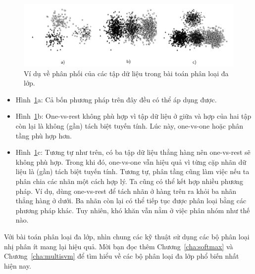 \begin{figure}[t]
\centering
    \includegraphics[width = \textwidth]{Chapters/05_NeuralNetworks/12_binaryclassifiers/latex/dist.pdf}
    \caption[]{Ví dụ về phân phối của các tập dữ liệu trong bài toán
    phân loại đa lớp.}
    \label{fig:10_4}
\end{figure}
\begin{itemize}
\item Hình~\ref{fig:10_4}a: Cả bốn phương pháp trên đây đều có thể áp dụng được. 
 
\item Hình~\ref{fig:10_4}b: One-vs-rest không phù hợp vì tập dữ liệu ở giữa và
hợp của hai tập còn lại là không (gần) {tách biệt tuyến tính}. Lúc này,
one-vs-one hoặc phân tầng phù hợp hơn.
 
\item Hình~\ref{fig:10_4}c: Tương tự như trên, có ba tập dữ liệu thẳng hàng
nên one-vs-rest sẽ không phù hợp. Trong khi đó, one-vs-one vẫn hiệu quả vì
từng cặp nhãn dữ liệu là (gần) {tách biệt tuyến tính}. Tương tự, phân tầng cũng
làm việc nếu ta phân chia các nhãn một cách hợp lý. Ta cũng có thể kết hợp
nhiều phương pháp. Ví dụ, dùng one-vs-rest để tách nhãn ở hàng trên ra khỏi ba nhãn
thẳng hàng ở dưới. Ba nhãn còn lại có thể tiếp tục được phân loại bằng các phương pháp khác. Tuy nhiên, khó khăn vẫn nằm ở việc phân nhóm như thế nào. 
\end{itemize}

Với bài toán phân loại đa lớp, nhìn chung các kỹ thuật sử dụng các bộ phân loại
nhị phân ít mang lại hiệu quả. Mời bạn đọc thêm
Chương~\ref{cha:softmax} và Chương~\ref{cha:multisvm} để tìm hiểu về các bộ phân
loại đa lớp phổ biến nhất hiện nay.

 
 
 
